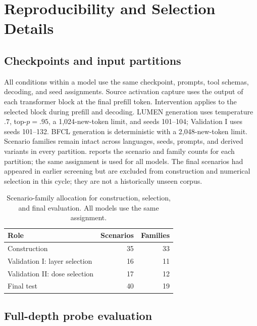 \section{Reproducibility and Selection Details}
\label{app:reproducibility}

\subsection{Checkpoints and input partitions}\label{app:checkpoints}

All conditions within a model use the same checkpoint, prompts, tool schemas, decoding, and seed assignments. Source activation capture uses the output of each transformer block at the final prefill token. Intervention applies to the selected block during prefill and decoding. LUMEN generation uses temperature $.7$, top-$p=.95$, a 1,024-new-token limit, and seeds 101--104; Validation I uses seeds 101--132. BFCL generation is deterministic with a 2,048-new-token limit. Scenario families remain intact across languages, seeds, prompts, and derived variants in every partition.  reports the scenario and family counts for each partition; the same assignment is used for all models. The final scenarios had appeared in earlier screening but are excluded from construction and numerical selection in this cycle; they are not a historically unseen corpus.



\begin{table}[htbp]
\centering
\footnotesize\setlength{\tabcolsep}{4pt}
\begin{tabularx}{\linewidth}{@{}>{\raggedright\arraybackslash}Xrr@{}}
\toprule
Role & Scenarios & Families \\
\midrule
Construction & 35 & 33 \\
Validation I: layer selection & 16 & 11 \\
Validation II: dose selection & 17 & 12 \\
Final test & 40 & 19 \\
\bottomrule
\end{tabularx}
\caption{Scenario-family allocation for construction, selection, and final evaluation.
All models use the same assignment.}
\label{tab:current-partitions}
\end{table}


\subsection{Full-depth probe evaluation}
\label{app:selection}

